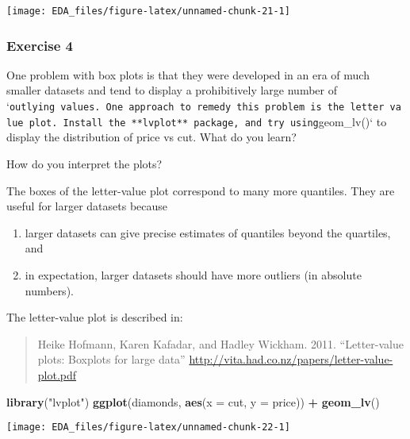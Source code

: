\documentclass[]{book}
\newenvironment{Shaded}{\begin{snugshade}}{\end{snugshade}}
\newcommand{\DataTypeTok}[1]{\textcolor[rgb]{0.13,0.29,0.53}{#1}}
\newcommand{\KeywordTok}[1]{\textcolor[rgb]{0.13,0.29,0.53}{\textbf{#1}}}
\newcommand{\NormalTok}[1]{#1}
\newcommand{\OperatorTok}[1]{\textcolor[rgb]{0.81,0.36,0.00}{\textbf{#1}}}
\newcommand{\StringTok}[1]{\textcolor[rgb]{0.31,0.60,0.02}{#1}}
\providecommand{\tightlist}{%
  \setlength{\itemsep}{0pt}\setlength{\parskip}{0pt}}
\theoremstyle{plain}
\theoremstyle{remark}
\theoremstyle{definition}
\theoremstyle{definition}
\theoremstyle{definition}
\theoremstyle{remark}
\begin{document}
\begin{center}\texttt{[image: EDA\_files/figure-latex/unnamed-chunk-21-1]} \end{center}

\hypertarget{exercise-4-10}{%
\subsubsection{Exercise 4}\label{exercise-4-10}}

One problem with box plots is that they were developed in an era of much
smaller datasets and tend to display a prohibitively large number of
`\texttt{outlying\ values\textquotesingle{}\textquotesingle{}.\ One\ approach\ to\ remedy\ this\ problem\ is\ the\ letter\ value\ plot.\ Install\ the\ **lvplot**\ package,\ and\ try\ using}geom\_lv()`
to display the distribution of price vs cut. What do you learn?

How do you interpret the plots?

The boxes of the letter-value plot correspond to many more quantiles.
They are useful for larger datasets because

\begin{enumerate}
\def\labelenumi{\arabic{enumi}.}
\tightlist
\item
  larger datasets can give precise estimates of quantiles beyond the
  quartiles, and
\item
  in expectation, larger datasets should have more outliers (in absolute
  numbers).
\end{enumerate}

The letter-value plot is described in:

\begin{quote}
Heike Hofmann, Karen Kafadar, and Hadley Wickham. 2011. ``Letter-value
plots: Boxplots for large data''
\url{http://vita.had.co.nz/papers/letter-value-plot.pdf}
\end{quote}

\begin{Shaded}
\begin{Highlighting}[]
\KeywordTok{library}\NormalTok{(}\StringTok{"lvplot"}\NormalTok{)}
\KeywordTok{ggplot}\NormalTok{(diamonds, }\KeywordTok{aes}\NormalTok{(}\DataTypeTok{x =}\NormalTok{ cut, }\DataTypeTok{y =}\NormalTok{ price)) }\OperatorTok{+}
\StringTok{  }\KeywordTok{geom_lv}\NormalTok{()}
\end{Highlighting}
\end{Shaded}

\begin{center}\texttt{[image: EDA\_files/figure-latex/unnamed-chunk-22-1]} \end{center}
\end{document}
